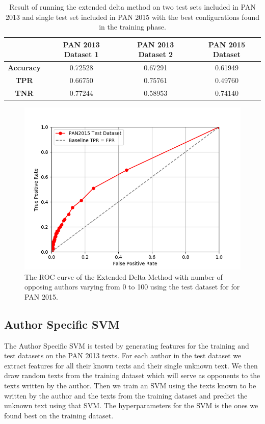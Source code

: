 \begin{table}
    \centering
    \begin{tabular}{c|ccc}
        & \textbf{PAN 2013 Dataset 1} & \textbf{PAN 2013 Dataset 2} & \textbf{PAN 2015 Dataset} \\
        \hline
        \textbf{Accuracy}  & 0.72528 & 0.67291 & 0.61949 \\
        \textbf{\gls{TPR}} & 0.66750 & 0.75761 & 0.49760 \\
        \textbf{\gls{TNR}} & 0.77244 & 0.58953 & 0.74140
    \end{tabular}
    \caption{Result of running the extended delta method on two test sets
    included in PAN 2013 and single test set included in PAN 2015 with the best
    configurations found in the training phase.}
    \label{tab:extended_delta_method_final_results}
\end{table}

\begin{figure}
    \centering
    \includegraphics[width=.7\textwidth]{./pictures/extended_delta_method_roc.png}
    \caption{The ROC curve of the Extended Delta Method with number of opposing
    authors varying from 0 to 100 using the test dataset for for PAN 2015.}
    \label{fig:extended_delta_method_roc}
\end{figure}

\subsection{Author Specific SVM} \label{subsec:results:author_specific_svm}

The Author Specific SVM is tested by generating features for the training and
test datasets on the PAN 2013 texts. For each author in the test dataset we
extract features for all their known texts and their single unknown text. We
then draw random texts from the training dataset which will serve as opponents
to the texts written by the author. Then we train an SVM using the texts known
to be written by the author and the texts from the training dataset and predict
the unknown text using that SVM. The hyperparameters for the SVM is the ones we
found best on the training dataset.

